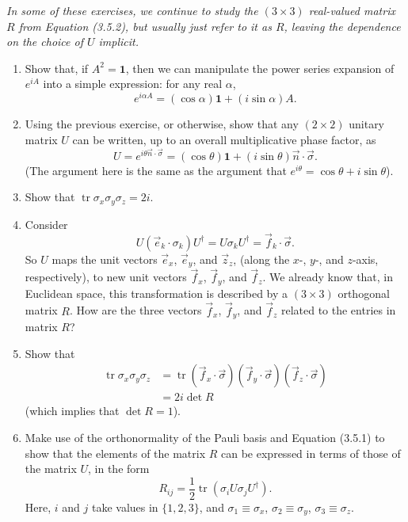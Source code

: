 \documentclass[fleqn]{article}
\begin{document}
\emph{In some of these exercises, we continue to study the \((3\times 3)\) real-valued matrix \(R\) from Equation (3.5.2), but usually just refer to it as \(R\), leaving the dependence on the choice of \(U\) implicit.}

\begin{enumerate}
\def\labelenumi{\arabic{enumi}.}
\item
  Show that, if \(A^2=\mathbf{1}\), then we can manipulate the power series expansion of \(e^{iA}\) into a simple expression: for any real \(\alpha\),
  \[
     e^{i\alpha A}
     = (\cos\alpha)\mathbf{1}+ (i\sin\alpha)A.
   \]
\item
  Using the previous exercise, or otherwise, show that any \((2\times 2)\) unitary matrix \(U\) can be written, up to an overall multiplicative phase factor, as
  \[
     U
     = e^{i \theta \vec{n}\cdot\vec{\sigma}}
     = (\cos\theta)\mathbf{1}+ (i\sin\theta)\vec{n}\cdot\vec{\sigma}.
   \]
  (The argument here is the same as the argument that \(e^{i\theta}=\cos\theta +i\sin\theta\)).
\item
  Show that \(\operatorname{tr}\sigma_x\sigma_y\sigma_z = 2i\).
\item
  Consider
  \[
     U(\vec e_k\cdot\sigma_k)U^\dagger=U\sigma_kU^\dagger={\vec f_k}\cdot\vec\sigma.
   \]
  So \(U\) maps the unit vectors \(\vec e_x\), \(\vec e_y\), and \(\vec z_z\), (along the \(x\)-, \(y\)-, and \(z\)-axis, respectively), to new unit vectors \(\vec f_x\), \(\vec f_y\), and \(\vec f_z\).
  We already know that, in Euclidean space, this transformation is described by a \((3\times 3)\) orthogonal matrix \(R\).
  How are the three vectors \(\vec f_x\), \(\vec f_y\), and \(\vec f_z\) related to the entries in matrix \(R\)?
\item
  Show that
  \[
     \begin{aligned}
       \operatorname{tr}\sigma_x\sigma_y\sigma_z
       &= \operatorname{tr}({\vec f_x}\cdot\vec\sigma)( {\vec f_y}\cdot\vec\sigma)({\vec f_z}\cdot\vec\sigma)
     \\&= 2i\det R
     \end{aligned}
   \]
  (which implies that \(\det R=1\)).
\item
  Make use of the orthonormality of the Pauli basis and Equation (3.5.1) to show that the elements of the matrix \(R\) can be expressed in terms of those of the matrix \(U\), in the form
  \[
     R_{ij}=\frac12\operatorname{tr}\left(\sigma_i U\sigma_j U^\dagger\right).
   \]
  Here, \(i\) and \(j\) take values in \(\{1,2,3\}\), and \(\sigma_1\equiv\sigma_x\), \(\sigma_2\equiv\sigma_y\), \(\sigma_3\equiv\sigma_z\).

\end{enumerate}
\end{document}
